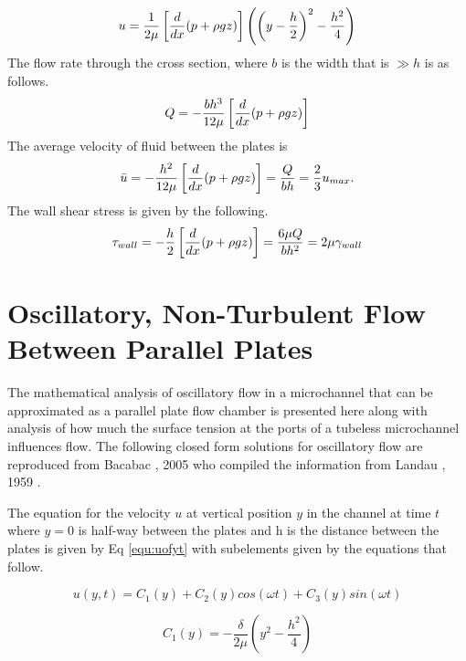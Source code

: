 \begin{equation}
\centering
u= \frac{1}{2\mu}\left[\frac{d}{dx}(p+\rho g z)\right]\left(\left(y-\frac{h}{2}\right)^{2}-\frac{h^{2}}{4}\right)
\label{equ:u}
\end{equation}
The flow rate through the cross section, where $b$ is the width that is $\gg h$ is as follows.
\begin{equation}
\centering
Q=-\frac{bh^{3}}{12\mu}\left[\frac{d}{dx}(p+\rho g z)\right]
\label{equ:Q}
\end{equation}
The average velocity of fluid between the plates is
\begin{equation}
\centering
\bar u = -\frac{h^{2}}{12\mu}\left[\frac{d}{dx}(p+\rho g z)\right] = \frac{Q}{bh} = \frac{2}{3}u_{max}.
\label{equ:ubar}
\end{equation}
The wall shear stress is given by the following.
\begin{equation}
\centering
\tau_{wall} = -\frac{h}{2} \left[\frac{d}{dx}(p+\rho g z)\right] = \frac{6\mu Q}{bh^{2}} = 2\mu \gamma_{wall}
\label{equ:tauWall}
\end{equation}

\section{Oscillatory, Non-Turbulent Flow Between Parallel Plates}

The mathematical analysis of oscillatory flow in a microchannel that can be approximated as a parallel plate flow chamber is presented here along with analysis of how much the surface tension at the ports of a tubeless microchannel influences flow. The following closed form solutions for oscillatory flow are reproduced from Bacabac \etal, 2005 \cite{Bacabac:2005ax} who compiled the information from Landau \etal, 1959 \cite{Landau:1959vh}. 

The equation for the velocity $u$ at vertical position $y$ in the channel at time $t$ where $y=0$ is half-way between the plates and h is the distance between the plates is given by Eq \ref{equ:uofyt} with subelements given by the equations that follow.

\begin{equation}
u(y,t)=C_{1}(y)+C_{2}(y)cos(\omega t)+C_{3}(y)sin(\omega t)
\label{equ:uofyt}
\end{equation}

\begin{equation}
C_{1}(y)=-\frac{\delta}{2\mu}\left(y^{2}-\frac{h^{2}}{4}\right)
\label{equ:C1}
\end{equation}

